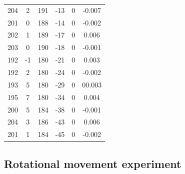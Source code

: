 \documentclass[a4paper, 12pt]{article}
\begin{document}
\begin{table}[H]
\begin{tabular}{@{}cccccc@{}}
    204                   & 2                     & 191               & -13               & 0                 & -0.007              \\
    201                   & 0                     & 188               & -14               & 0                 & -0.002              \\
    202                   & 1                     & 189               & -17               & 0                 & 0.006               \\
    203                   & 0                     & 190               & -18               & 0                 & -0.001              \\
    192                   & -1                    & 180               & -21               & 0                 & 0.003               \\
    192                   & 2                     & 180               & -24               & 0                 & -0.002              \\
    193                   & 5                     & 180               & -29               & 0                 & 00.003              \\
    195                   & 7                     & 180               & -34               & 0                 & 0.004               \\
    200                   & 5                     & 184               & -38               & 0                 & -0.001              \\
    204                   & 3                     & 186               & -43               & 0                 & 0.006               \\
    201                   & 1                     & 184               & -45               & 0                 & -0.002              \\ \bottomrule
    \end{tabular}
    \end{table}

    \subsection{Rotational movement experiment}
\end{document}
